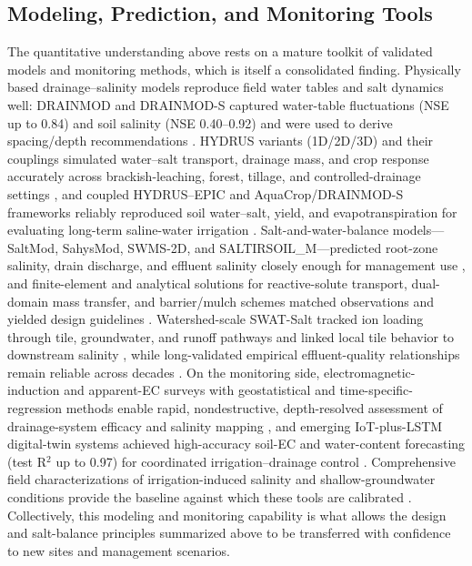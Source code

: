 \documentclass[11pt]{article}
\begin{document}
\subsection{Modeling, Prediction, and Monitoring Tools}

The quantitative understanding above rests on a mature toolkit of validated models and monitoring methods, which is itself a consolidated finding. Physically based drainage--salinity models reproduce field water tables and salt dynamics well: DRAINMOD and DRAINMOD-S captured water-table fluctuations (NSE up to 0.84) and soil salinity (NSE 0.40--0.92) and were used to derive spacing/depth recommendations \parencite{Chen2025,Tian2023,Tian2023c,Tian2024,Davoodi2019,Li2024}. HYDRUS variants (1D/2D/3D) and their couplings simulated water--salt transport, drainage mass, and crop response accurately across brackish-leaching, forest, tillage, and controlled-drainage settings \parencite{Li2023,Dou2022,Wang2024c,Li2026,Jia2023,Liu2022}, and coupled HYDRUS--EPIC and AquaCrop/DRAINMOD-S frameworks reliably reproduced soil water--salt, yield, and evapotranspiration for evaluating long-term saline-water irrigation \parencite{Feng2019,Feng2021,Li2024}. Salt-and-water-balance models---SaltMod, SahysMod, SWMS-2D, and SALTIRSOIL\_M---predicted root-zone salinity, drain discharge, and effluent salinity closely enough for management use \parencite{Bahçeci2006,Bahçeci2007,Yao2017,Qian2021b,Abdelkrim2021}, and finite-element and analytical solutions for reactive-solute transport, dual-domain mass transfer, and barrier/mulch schemes matched observations and yielded design guidelines \parencite{KAMRA1991,KAMRA1994,Zhang2022,Zhang2024,Youngs2000}. Watershed-scale SWAT-Salt tracked ion loading through tile, groundwater, and runoff pathways and linked local tile behavior to downstream salinity \parencite{Addab2022,Liu2026}, while long-validated empirical effluent-quality relationships remain reliable across decades \parencite{JOHNSTON1993,Kelleners2000}. On the monitoring side, electromagnetic-induction and apparent-EC surveys with geostatistical and time-specific-regression methods enable rapid, nondestructive, depth-resolved assessment of drainage-system efficacy and salinity mapping \parencite{Narjary2024,Song2023,Yu2025,Singh2020d,Mirlas2003}, and emerging IoT-plus-LSTM digital-twin systems achieved high-accuracy soil-EC and water-content forecasting (test R$^2$ up to 0.97) for coordinated irrigation--drainage control \parencite{Qin2025}. Comprehensive field characterizations of irrigation-induced salinity and shallow-groundwater conditions provide the baseline against which these tools are calibrated \parencite{Gates2002}. Collectively, this modeling and monitoring capability is what allows the design and salt-balance principles summarized above to be transferred with confidence to new sites and management scenarios.

\printbibliography
\end{document}
